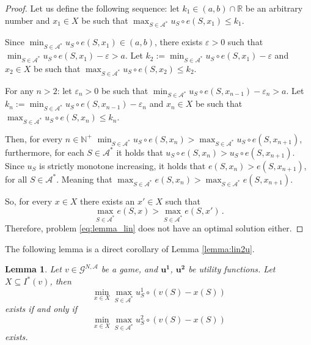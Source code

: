 \documentclass[a4paper,12pt]{article}
\newtheorem{lemma}[theorem]{Lemma}
\theoremstyle{definition}
\theoremstyle{remark}
\begin{document}
\begin{proof}
Let us define the following sequence:
let $k_1 \in (a, b) \cap \mathbb{R}$ be an arbitrary number and $x_1\in X$ be such that $\max_{S\in \mathcal{A}^*} u_S \circ e(S, x_1) \leq k_1$.

Since $\min_{S\in \mathcal{A}^*} u_S \circ e(S, x_1) \in (a, b)$, there exists $\varepsilon > 0$ such that $\min_{S\in \mathcal{A}^*} u_S \circ e(S, x_1) - \varepsilon > a$.
Let $k_2 := \min_{S\in \mathcal{A}^*} u_S \circ e(S, x_1) - \varepsilon$ and $x_2 \in X$ be such that $\max_{S\in \mathcal{A}^*} u_S \circ e(S, x_2) \leq k_2$.

For any $n > 2$: let $\varepsilon_n >0$ be such that $\min_{S\in \mathcal{A}^*} u_S \circ e(S, x_{n-1}) - \varepsilon_n > a$. Let $k_n := \min_{S\in \mathcal{A}^\ast} u_S \circ e(S, x_{n -1}) - \varepsilon_n$ and $x_n \in X$ be such that $\max_{S\in \mathcal{A}^\ast} u_S \circ e(S, x_n) \leq k_n$.

Then, for every $n \in \mathbb{N}^+$ $\min_{S\in \mathcal{A}^\ast} u_S \circ e(S, x_n) > \max_{S\in \mathcal{A}^\ast} u_S \circ e(S, x_{n+1})$, furthermore, for each $S\in \mathcal{A}^\ast$ it holds that $u_S \circ e(S, x_n) > u_S \circ e(S, x_{n+1})$. Since $u_S$ is strictly monotone increasing, it holds that $e(S, x_n) > e(S, x_{n+1})$,  for all $S\in \mathcal{A}^\ast$. Meaning that $\max_{S\in \mathcal{A}^\ast} e(S, x_n) > \max_{S\in \mathcal{A}^\ast} e(S, x_{n+1})$.

So, for every $x\in X$ there exists an $x'\in X$ such that
\begin{equation*}
\max_{S\in \mathcal{A}^*} e(S, x) > \max_{S\in \mathcal{A}^*} e(S, x') \, .
\end{equation*}
Therefore, problem \eqref{eq:lemma_lin} does not have an optimal solution either.
\end{proof}

The following lemma is a direct corollary of Lemma \ref{lemma:lin2u}.

\begin{lemma}\label{lemma:lexi}
Let $v \in \mathcal{G}^{N,\mathcal{A}}$ be a game, and $\mathbf{u^1}$, $\mathbf{u^2}$ be utility functions. Let $X\subseteq I^*(v)$, then 
\begin{equation*}
\min_{x\in X} \max_{S\in \mathcal{A}^*} u^1_S \circ (v(S)-x(S))
\end{equation*}
exists if and only if
\begin{equation*}
\min_{x\in X} \max_{S\in \mathcal{A}^*} u^2_S \circ (v(S)-x(S))
\end{equation*}
exists.
\end{lemma}
\end{document}
